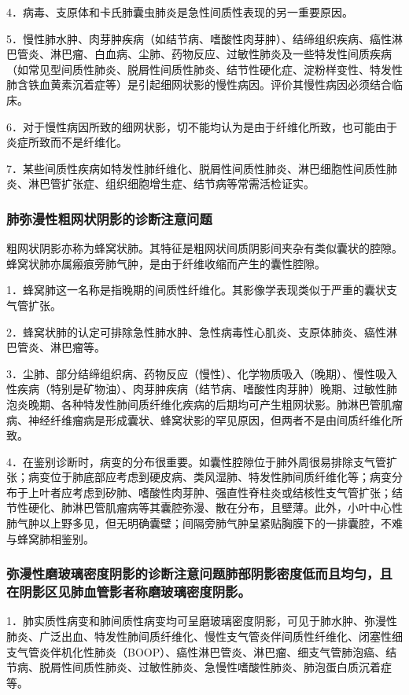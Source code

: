 4．病毒、支原体和卡氏肺囊虫肺炎是急性间质性表现的另一重要原因。

5．慢性肺水肿、肉芽肿疾病（如结节病、嗜酸性肉芽肿）、结缔组织疾病、癌性淋巴管炎、淋巴瘤、白血病、尘肺、药物反应、过敏性肺炎及一些特发性间质疾病（如常见型间质性肺炎、脱屑性间质性肺炎、结节性硬化症、淀粉样变性、特发性肺含铁血黄素沉着症等）是引起细网状影的慢性病因。评价其慢性病因必须结合临床。

6．对于慢性病因所致的细网状影，切不能均认为是由于纤维化所致，也可能由于炎症所致而不是纤维化。

7．某些间质性疾病如特发性肺纤维化、脱屑性间质性肺炎、淋巴细胞性间质性肺炎、淋巴管扩张症、组织细胞增生症、结节病等常需活检证实。

\subsubsection{肺弥漫性粗网状阴影的诊断注意问题}

粗网状阴影亦称为蜂窝状肺。其特征是粗网状间质阴影间夹杂有类似囊状的腔隙。蜂窝状肺亦属瘢痕旁肺气肿，是由于纤维收缩而产生的囊性腔隙。

1．蜂窝肺这一名称是指晚期的间质性纤维化。其影像学表现类似于严重的囊状支气管扩张。

2．蜂窝状肺的认定可排除急性肺水肿、急性病毒性心肌炎、支原体肺炎、癌性淋巴管炎、淋巴瘤等。

3．尘肺、部分结缔组织病、药物反应（慢性）、化学物质吸入（晚期）、慢性吸入性疾病（特别是矿物油）、肉芽肿疾病（结节病、嗜酸性肉芽肿）晚期、过敏性肺泡炎晚期、各种特发性肺间质纤维化疾病的后期均可产生粗网状影。肺淋巴管肌瘤病、神经纤维瘤病是形成囊状、蜂窝状影的罕见原因，但两者不是由间质纤维化所致。

4．在鉴别诊断时，病变的分布很重要。如囊性腔隙位于肺外周很易排除支气管扩张；病变位于肺底部应考虑到硬皮病、类风湿肺、特发性肺间质纤维化等；病变分布于上叶者应考虑到矽肺、嗜酸性肉芽肿、强直性脊柱炎或结核性支气管扩张；结节性硬化、肺淋巴管肌瘤病等其囊腔弥漫、散在分布，且壁薄。此外，小叶中心性肺气肿以上野多见，但无明确囊壁；间隔旁肺气肿呈紧贴胸膜下的一排囊腔，不难与蜂窝肺相鉴别。

\subsubsection{弥漫性磨玻璃密度阴影的诊断注意问题肺部阴影密度低而且均匀，且在阴影区见肺血管影者称磨玻璃密度阴影。}

1．肺实质性病变和肺间质性病变均可呈磨玻璃密度阴影，可见于肺水肿、弥漫性肺炎、广泛出血、特发性肺间质纤维化、慢性支气管炎伴间质性纤维化、闭塞性细支气管炎伴机化性肺炎（BOOP）、癌性淋巴管炎、淋巴瘤、细支气管肺泡癌、结节病、脱屑性间质性肺炎、过敏性肺炎、急慢性嗜酸性肺炎、肺泡蛋白质沉着症等。

